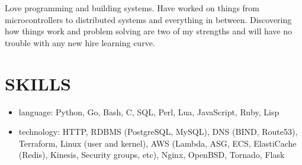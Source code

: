 \documentclass{res}
\begin{document}
\address{john@jjdev.com - (714) 895 6311 - Westminster, CA 92683}

\begin{resume}
    Love programming and building systems. Have worked on things
    from microcontrollers to distributed systems and everything in
    between. Discovering how things work and problem solving are two of my
    strengths and will have no trouble with any new hire learning curve.
\section{SKILLS}
\begin{itemize}
  \item
    language: Python, Go, Bash, C, SQL, Perl, Lua, JavaScript, Ruby, Lisp
  \item
    technology: HTTP, RDBMS (PostgreSQL, MySQL), DNS (BIND, Route53),
    Terraform, Linux (user and kernel), AWS (Lambda, ASG, ECS, ElastiCache
    (Redis), Kinesis, Security groups, etc), Nginx, OpenBSD, Tornado,
    Flask
  \end{itemize}

\end{resume}
\end{document}
